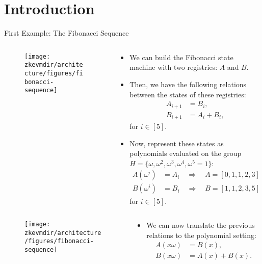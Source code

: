 
\section{Introduction}

\begin{frame}[allowframebreaks]{First Example: The Fibonacci Sequence}
\begin{columns}
\begin{column}{0.3\textwidth}
\begin{figure}
	\texttt{[image: \\zkevmdir/architecture/figures/fibonacci-sequence]}
\end{figure}
\end{column}
\begin{column}{0.7\textwidth}
\begin{itemize}
\small
\item We can build the Fibonacci state machine with two registries: $A$ and $B$.
\item Then, we have the following relations between the states of these registries:
\begin{align*}
A_{i+1} &= B_i, \\
B_{i+1} &= A_i + B_i,
\end{align*}
for $i \in [5]$.

\item Now, represent these states as polynomials evaluated on the group $H = \{\omega, \omega^2, \omega^3, \omega^4, \omega^5 = 1\}$:
\begin{align*}
A(\omega^i) &= A_i \quad \Longrightarrow \quad A = [0, 1, 1, 2, 3] \\
B(\omega^i) &= B_i \quad \Longrightarrow \quad B = [1, 1, 2, 3, 5]
\end{align*}
for $i \in [5]$.
\end{itemize}
\end{column}
\end{columns}

\begin{columns}
\begin{column}{0.3\textwidth}
\begin{figure}
	\texttt{[image: \\zkevmdir/architecture/figures/fibonacci-sequence]}
\end{figure}
\end{column}
\begin{column}{0.7\textwidth}
\begin{itemize}
\small
\item We can now translate the previous relations to the polynomial setting:
\begin{align*}
A(x\omega) &=  B(x), \\
B(x\omega) &=  A(x) + B(x).
\end{align*}


\end{itemize}
\end{column}
\end{columns}
\end{frame}
